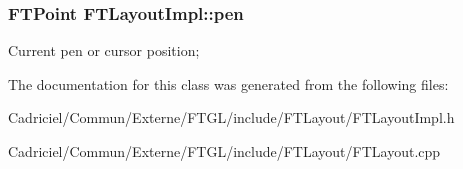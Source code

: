 \subsubsection[{\texorpdfstring{pen}{pen}}]{\setlength{\rightskip}{0pt plus 5cm}F\+T\+Point F\+T\+Layout\+Impl\+::pen\hspace{0.3cm}{\ttfamily [protected]}}\hypertarget{class_f_t_layout_impl_aefaff875c0cf4fe5710897f614be44ac}{}\label{class_f_t_layout_impl_aefaff875c0cf4fe5710897f614be44ac}
Current pen or cursor position; 

The documentation for this class was generated from the following files\+:\begin{DoxyCompactItemize}
\item 
Cadriciel/\+Commun/\+Externe/\+F\+T\+G\+L/include/\+F\+T\+Layout/F\+T\+Layout\+Impl.\+h\item 
Cadriciel/\+Commun/\+Externe/\+F\+T\+G\+L/include/\+F\+T\+Layout/F\+T\+Layout.\+cpp\end{DoxyCompactItemize}
